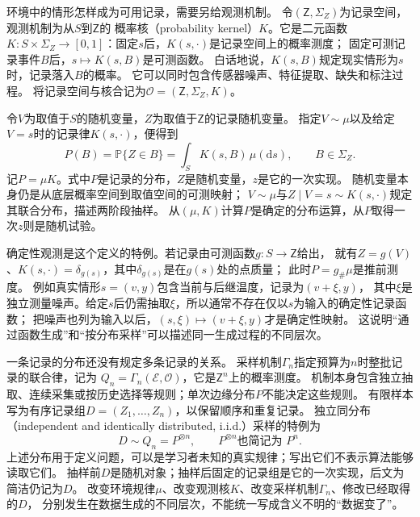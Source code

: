 环境中的情形怎样成为可用记录，需要另给观测机制。
令$(\mathsf Z,\Sigma_Z)$为记录空间，观测机制为从$S$到$\mathsf Z$的
概率核（probability kernel）$K$。它是二元函数
$K:S\times\Sigma_Z\to[0,1]$：固定$s$后，$K(s,\cdot)$是记录空间上的概率测度；
固定可测记录事件$B$后，$s\mapsto K(s,B)$是可测函数。
白话地说，$K(s,B)$规定现实情形为$s$时，记录落入$B$的概率。
它可以同时包含传感器噪声、特征提取、缺失和标注过程。
将记录空间与核合记为$\mathcal O=(\mathsf Z,\Sigma_Z,K)$。

令$V$为取值于$S$的随机变量，$Z$为取值于$\mathsf Z$的记录随机变量。
指定$V\sim\mu$以及给定$V=s$时的记录律$K(s,\cdot)$，便得到
\begin{equation}
  P(B)=\mathbb P\{Z\in B\}
      =\int_S K(s,B)\,\mu(\mathrm ds),
  \qquad B\in\Sigma_Z.
  \label{eq:future-observation-law}
\end{equation}
记$P=\mu K$。式中$P$是记录的分布，$Z$是随机变量，$z$是它的一次实现。
随机变量本身仍是从底层概率空间到取值空间的可测映射；
$V\sim\mu$与$Z\mid V=s\sim K(s,\cdot)$规定其联合分布，描述两阶段抽样。
从$(\mu,K)$计算$P$是确定的分布运算，从$P$取得一次$z$则是随机试验。

确定性观测是这个定义的特例。若记录由可测函数$g:S\to\mathsf Z$给出，
就有$Z=g(V)$、$K(s,\cdot)=\delta_{g(s)}$，其中$\delta_{g(s)}$是在$g(s)$处的点质量；
此时$P=g_{\#}\mu$是推前测度。
例如真实情形$s=(v,y)$包含当前与后继温度，记录为$(v+\xi,y)$，
其中$\xi$是独立测量噪声。给定$s$后仍需抽取$\xi$，所以通常不存在仅以$s$为输入的确定性记录函数；
把噪声也列为输入以后，$(s,\xi)\mapsto(v+\xi,y)$才是确定性映射。
这说明“通过函数生成”和“按分布采样”可以描述同一生成过程的不同层次。

一条记录的分布还没有规定多条记录的关系。
采样机制$\Gamma_n$指定预算为$n$时整批记录的联合律，记为
$Q_n=\Gamma_n(\mathcal E,\mathcal O)$，它是$\mathsf Z^n$上的概率测度。
机制本身包含独立抽取、连续采集或按历史选择等规则；单次边缘分布$P$不能决定这些规则。
有限样本写为有序记录组$D=(Z_1,\ldots,Z_n)$，以保留顺序和重复记录。
独立同分布（independent and identically distributed, i.i.d.）采样的特例为
\begin{equation}
  D\sim Q_n=P^{\otimes n},\qquad P^{\otimes n}\text{也简记为 }P^n.
  \label{eq:future-sampling-law}
\end{equation}
上述分布用于定义问题，可以是学习者未知的真实规律；写出它们不表示算法能够读取它们。
抽样前$D$是随机对象；抽样后固定的记录组是它的一次实现，后文为简洁仍记为$D$。
改变环境规律$\mu$、改变观测核$K$、改变采样机制$\Gamma_n$、修改已经取得的$D$，
分别发生在数据生成的不同层次，不能统一写成含义不明的“数据变了”。

